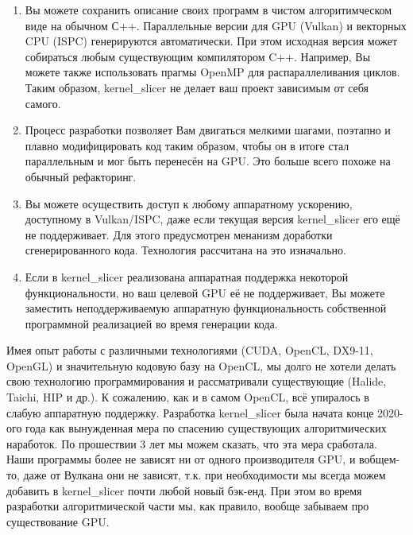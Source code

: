 \documentclass[11pt,fleqn,english,russian]{report} %
\begin{document}
\begin{enumerate}

\item Вы можете сохранить описание своих программ в чистом алгоритимческом виде на обычном С++. Параллельные версии для GPU (Vulkan) и векторных CPU (ISPC) генерируются автоматически. При этом исходная версия может собираться любым существующим компилятором C++. Например, Вы можете также использовать прагмы OpenMP для распараллеливания циклов. Таким образом, kernel\_slicer не делает ваш проект зависимым от себя самого.

\item Процесс разработки позволяет Вам двигаться мелкими шагами, поэтапно и плавно модифицировать код таким образом, чтобы он в итоге стал параллельным и мог быть перенесён на GPU. Это больше всего похоже на обычный рефакторинг.

\item Вы можете осуществить доступ к любому аппаратному ускорению, доступному в Vulkan/ISPC, даже если текущая версия kernel\_slicer его ещё не поддерживает. Для этого предусмотрен менанизм доработки сгенерированного кода. Технология рассчитана на это изначально.

\item Если в kernel\_slicer реализована аппаратная поддержка некоторой функциональности, но ваш целевой GPU её не поддерживает, Вы можете заместить неподдерживаемую аппаратную функциональность собственной программной реализацией во время генерации кода.
\end{enumerate}

\begin{remark}Имея опыт работы с различными технологиями (CUDA, OpenCL, DX9-11, OpenGL) и значительную кодовую базу на OpenCL, мы долго не хотели делать свою технологию программирования и рассматривали существующие (Halide, Taichi, HIP и др.). К сожалению, как и в самом OpenCL, всё упиралось в слабую аппаратную поддержку. Разработка kernel\_slicer была начата конце 2020-ого года как вынужденная мера по спасению существующих алгоритмических наработок. По прошествии 3 лет мы можем сказать, что эта мера сработала. Наши программы более не зависят ни от одного производителя GPU, и вобщем-то, даже от Вулкана они не зависят, т.к. при необходимости мы всегда можем добавить в kernel\_slicer почти любой новый бэк-енд. При этом во время разработки алгоритмической части мы, как правило, вообще забываем про существование GPU.
\end{remark}
\end{document}
